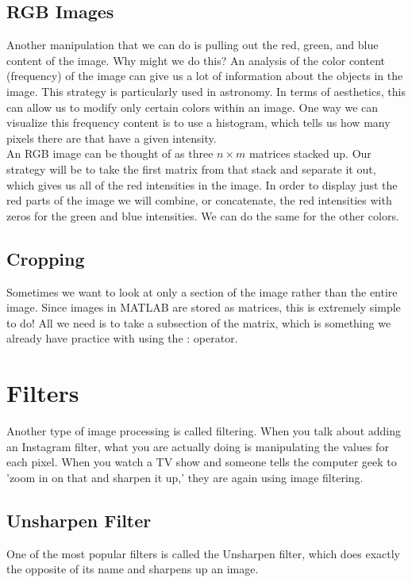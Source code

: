 \documentclass[paper=a4, fontsize=11pt]{scrartcl} %
\numberwithin{equation}{section} %
\numberwithin{figure}{section} %
\numberwithin{table}{section} %
\begin{document}
\subsection{RGB Images}
Another manipulation that we can do is pulling out the red, green, and blue content of the image. Why might we do this? An analysis of the color content (frequency) of the image can give us a lot of information about the objects in the image. This strategy is particularly used in astronomy. In terms of aesthetics, this can allow us to modify only certain colors within an image. One way we can visualize this frequency content is to use a histogram, which tells us how many pixels there are that have a given intensity.\\

An RGB image can be thought of as three $n\times m$ matrices stacked up. Our strategy will be to take the first matrix from that stack and separate it out, which gives us all of the red intensities in the image. In order to display just the red parts of the image we will combine, or concatenate, the red intensities with zeros for the green and blue intensities. We can do the same for the other colors. 
\newpage


\subsection{Cropping}
Sometimes we want to look at only a section of the image rather than the entire image. Since images in MATLAB are stored as matrices, this is extremely simple to do! All we need is to take a subsection of the matrix, which is something we already have practice with using the : operator. 


\section{Filters}
Another type of image processing is called filtering. When you talk about adding an Instagram filter, what you are actually doing is manipulating the values for each pixel. When you watch a TV show and someone tells the computer geek to 'zoom in on that and sharpen it up,' they are again using image filtering. 

\subsection{Unsharpen Filter}
One of the most popular filters is called the Unsharpen filter, which does exactly the opposite of its name and sharpens up an image. \\
\end{document}
